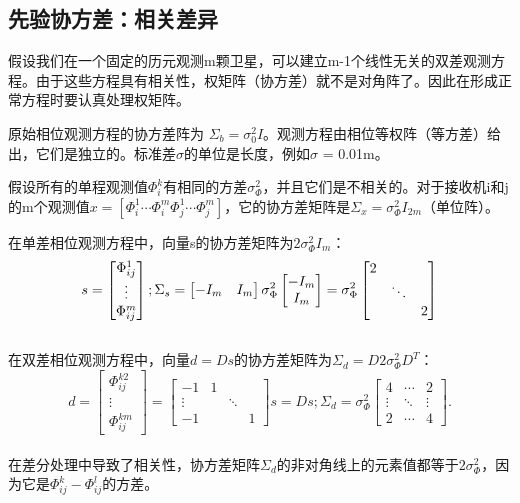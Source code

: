 \subsection{先验协方差：相关差异}

假设我们在一个固定的历元观测m颗卫星，可以建立m-1个线性无关的双差观测方程。由于这些方程具有相关性，权矩阵（协方差）就不是对角阵了。因此在形成正常方程时要认真处理权矩阵。

原始相位观测方程的协方差阵为 $\Sigma_{b}=\sigma_{0}^{2}I$。观测方程由相位等权阵（等方差）给出，它们是独立的。标准差$\sigma$的单位是长度，例如$\sigma$ = 0.01m。

假设所有的单程观测值$\Phi_{i}^{k}$有相同的方差$\sigma_{\Phi}^{2}$，并且它们是不相关的。对于接收机i和j的m个观测值$x=[\Phi_{i}^{1} \cdots \Phi_{i}^{m} \Phi_{j}^{1} \cdots \Phi_{j}^{m}]$，它的协方差矩阵是$\Sigma_{x}=\sigma_{\Phi}^{2}I_{2m}$（单位阵）。

在单差相位观测方程中，向量s的协方差矩阵为$2\sigma_{\Phi}^{2}I_{m}$：
\begin{equation}
	s=\begin{bmatrix}
		\Phi_{ij}^{1}\\
		\vdots\\
		\Phi_{ij}^{m}
	\end{bmatrix};
	\Sigma_{s}=
	\begin{bmatrix}
		-I_{m}&I_{m}
	\end{bmatrix}
	\sigma_{\Phi}^{2}
	\begin{bmatrix}
		-I_{m}\\
		I_{m}
	\end{bmatrix}
	=\sigma_{\Phi}^{2}
	\begin{bmatrix}
		2\\
		&\ddots\\
		\multicolumn{2}{c}{\raisebox{1.3ex}[0pt]{\Huge}}&2
	\end{bmatrix}
\end{equation}\\
在双差相位观测方程中，向量$ d = Ds$的协方差矩阵为$\Sigma_{d}=D2\sigma_{\Phi}^{2}D^{T}$：
\begin{equation}
	d=\begin{bmatrix}
		\Phi_{ij}^{k2}\\
		\vdots\\
		\Phi_{ij}^{km}
	\end{bmatrix}
	=\begin{bmatrix}
		-1&1\\
		\vdots& & \ddots\\
		-1&&&1
	\end{bmatrix}s
	=Ds;
	\Sigma_{d}=\sigma_{\Phi}^{2}
	\begin{bmatrix}
		4&\cdots&2\\
		\vdots&\ddots&\vdots\\
		2&\cdots&4
	\end{bmatrix}.
\end{equation}\\
在差分处理中导致了相关性，协方差矩阵$\Sigma_{d}$的非对角线上的元素值都等于$2\sigma_{\Phi}^{2}$，因为它是$\Phi_{ij}^{k}-\Phi_{ij}^{l}$的方差。

